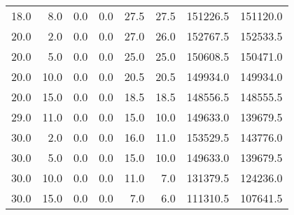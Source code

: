 \begin{tabular}{rrrrrrrr}
18.0 &  8.0 &             0.0 &        0.0 &        27.5 &       27.5 &     151226.5 &   151120.0 \\
20.0 &  2.0 &             0.0 &        0.0 &        27.0 &       26.0 &     152767.5 &   152533.5 \\
20.0 &  5.0 &             0.0 &        0.0 &        25.0 &       25.0 &     150608.5 &   150471.0 \\
20.0 & 10.0 &             0.0 &        0.0 &        20.5 &       20.5 &     149934.0 &   149934.0 \\
20.0 & 15.0 &             0.0 &        0.0 &        18.5 &       18.5 &     148556.5 &   148555.5 \\
29.0 & 11.0 &             0.0 &        0.0 &        15.0 &       10.0 &     149633.0 &   139679.5 \\
30.0 &  2.0 &             0.0 &        0.0 &        16.0 &       11.0 &     153529.5 &   143776.0 \\
30.0 &  5.0 &             0.0 &        0.0 &        15.0 &       10.0 &     149633.0 &   139679.5 \\
30.0 & 10.0 &             0.0 &        0.0 &        11.0 &        7.0 &     131379.5 &   124236.0 \\
30.0 & 15.0 &             0.0 &        0.0 &         7.0 &        6.0 &     111310.5 &   107641.5 \\
\bottomrule
\end{tabular}
